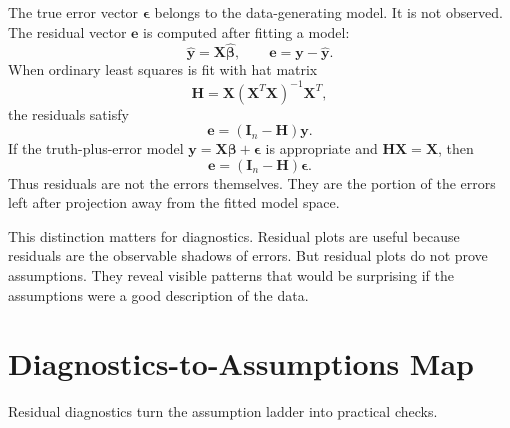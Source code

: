 The true error vector \(\boldsymbol{\epsilon}\) belongs to the data-generating model.  It is not observed.  The residual vector \(\mathbf{e}\) is computed after fitting a model:
\begin{equation}
  \widehat{\mathbf{y}}=\mathbf{X}\widehat{\boldsymbol{\beta}},
  \qquad
  \mathbf{e}=\mathbf{y}-\widehat{\mathbf{y}}.
\end{equation}
When ordinary least squares is fit with hat matrix
\begin{equation}
  \mathbf{H}=\mathbf{X}(\mathbf{X}^T\mathbf{X})^{-1}\mathbf{X}^T,
\end{equation}
the residuals satisfy
\begin{equation}
  \mathbf{e}=(\mathbf{I}_n-\mathbf{H})\mathbf{y}.
\end{equation}
If the truth-plus-error model \(\mathbf{y}=\mathbf{X}\boldsymbol{\beta}+\boldsymbol{\epsilon}\) is appropriate and \(\mathbf{H}\mathbf{X}=\mathbf{X}\), then
\begin{equation}
  \mathbf{e}=(\mathbf{I}_n-\mathbf{H})\boldsymbol{\epsilon}.
\end{equation}
Thus residuals are not the errors themselves.  They are the portion of the errors left after projection away from the fitted model space.

This distinction matters for diagnostics.  Residual plots are useful because residuals are the observable shadows of errors.  But residual plots do not prove assumptions.  They reveal visible patterns that would be surprising if the assumptions were a good description of the data.

\section{Diagnostics-to-Assumptions Map}

Residual diagnostics turn the assumption ladder into practical checks.

